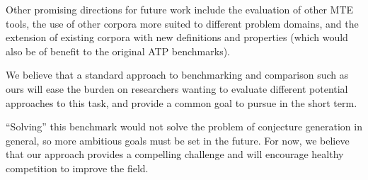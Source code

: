 Other promising directions for future work include the evaluation of other MTE
tools, the use of other corpora more suited to different problem domains, and
the extension of existing corpora with new definitions and properties (which
would also be of benefit to the original ATP benchmarks).

We believe that a standard approach to benchmarking and comparison such as ours
will ease the burden on researchers wanting to evaluate different potential
approaches to this task, and provide a common goal to pursue in the short term.

``Solving'' this benchmark would not solve the problem of conjecture generation
in general, so more ambitious goals must be set in the future. For now, we
believe that our approach provides a compelling challenge and will encourage
healthy competition to improve the field.





